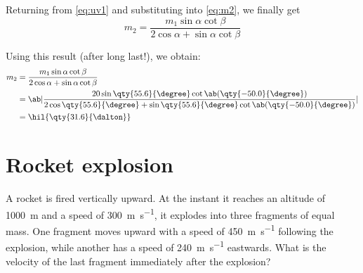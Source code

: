 Returning from \cref{eq:uv1} and substituting into \cref{eq:m2}, we
finally get
\begin{equation}
	m_2 = \dfrac{m_1\sin\alpha\cot\beta}{2\cos\alpha + \sin\alpha\cot\beta}
\end{equation}

Using this result (after long last!), we obtain:
\begin{align*}
	m_2 & = \dfrac{m_1\sin\alpha\cot\beta}{2\cos\alpha + \sin\alpha\cot\beta} \\
	    & =
	\ab|\frac{20\sin\qty{55.6}{\degree}\cot\ab(\qty{-50.0}{\degree})}{2\cos\qty{55.6}{\degree}
	+ \sin\qty{55.6}{\degree}\cot\ab(\qty{-50.0}{\degree})}|                  \\
	    & = \hil{\qty{31.6}{\dalton}}
\end{align*}

\section{Rocket explosion}
\begin{problem}
A rocket is fired vertically upward. At the instant it reaches an
altitude of \qty{1000}{\metre} and a
speed of \qty{300}{\metre\per\second}, it explodes into three
fragments of equal mass. One fragment moves
upward with a speed of \qty{450}{\metre\per\second} following the
explosion, while another has a speed of
\qty{240}{\metre\per\second} eastwards. What is the velocity of the
last fragment immediately after the explosion?
\end{problem}

